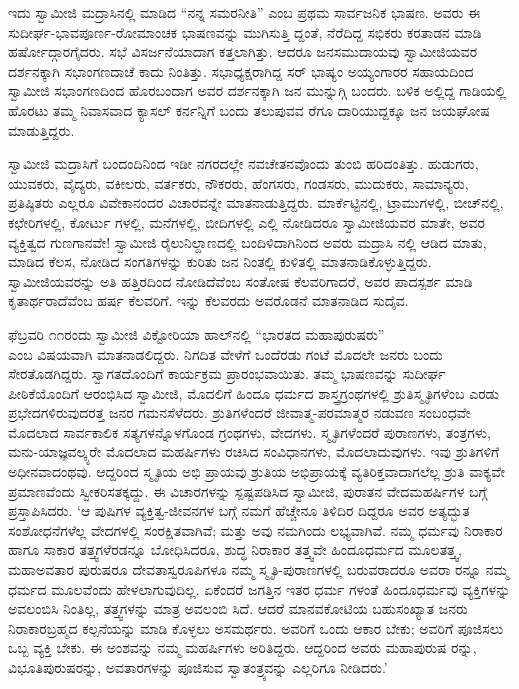 ಇದು ಸ್ವಾಮೀಜಿ ಮದ್ರಾಸಿನಲ್ಲಿ ಮಾಡಿದ “ನನ್ನ ಸಮರನೀತಿ” ಎಂಬ ಪ್ರಥಮ ಸಾರ್ವಜನಿಕ ಭಾಷಣ. ಅವರು ಈ ಸುದೀರ್ಘ-ಭಾವಪೂರ್ಣ-ರೋಮಾಂಚಕ ಭಾಷಣವನ್ನು ಮುಗಿಸುತ್ತಿ ದ್ದಂತೆ, ನೆರೆದಿದ್ದ ಸಭಿಕರು ಕರತಾಡನ ಮಾಡಿ ಹರ್ಷೋದ್ಗಾರಗೈದರು. ಸಭೆ ವಿಸರ್ಜನೆಯಾದಾಗ ಕತ್ತಲಾಗಿತ್ತು. ಆದರೂ ಜನಸಮುದಾಯವು ಸ್ವಾಮೀಜಿಯವರ ದರ್ಶನಕ್ಕಾಗಿ ಸಭಾಂಗಣದಾಚೆ ಕಾದು ನಿಂತಿತ್ತು. ಸಭಾಧ್ಯಕ್ಷರಾಗಿದ್ದ ಸರ್ ಭಾಷ್ಯಂ ಅಯ್ಯಂಗಾರರ ಸಹಾಯದಿಂದ ಸ್ವಾಮೀಜಿ ಸಭಾಂಗಣದಿಂದ ಹೊರಬಂದಾಗ ಅವರ ದರ್ಶನಕ್ಕಾಗಿ ಜನ ಮುನ್ನುಗ್ಗಿ ಬಂದರು. ಬಳಿಕ ಅಲ್ಲಿದ್ದ ಗಾಡಿಯಲ್ಲಿ ಹೊರಟು ತಮ್ಮ ನಿವಾಸವಾದ ಕ್ಯಾಸಲ್ ಕರ್ನನ್ನಿಗೆ ಬಂದು ತಲುಪುವವ ರೆಗೂ ದಾರಿಯುದ್ದಕ್ಕೂ ಜನ ಜಯಘೋಷ ಮಾಡುತ್ತಿದ್ದರು.

ಸ್ವಾಮೀಜಿ ಮದ್ರಾಸಿಗೆ ಬಂದಂದಿನಿಂದ ಇಡೀ ನಗರದಲ್ಲೇ ನವಚೇತನವೊಂದು ತುಂಬಿ ಹರಿದಂತಿತ್ತು. ಹುಡುಗರು, ಯುವಕರು, ವೈದ್ಯರು, ವಕೀಲರು, ವರ್ತಕರು, ನೌಕರರು, ಹೆಂಗಸರು, ಗಂಡಸರು, ಮುದುಕರು, ಸಾಮಾನ್ಯರು, ಪ್ರತಿಷ್ಠಿತರು ಎಲ್ಲರೂ ವಿವೇಕಾನಂದರ ವಿಚಾರವನ್ನೇ ಮಾತನಾಡುತ್ತಿದ್ದರು. ಮಾರ್ಕೆಟ್ಟಿನಲ್ಲಿ, ಟ್ರಾಮುಗಳಲ್ಲಿ, ಬೀಚ್​ನಲ್ಲಿ, ಕಛೇರಿಗಳಲ್ಲಿ, ಕೋರ್ಟು ಗಳಲ್ಲಿ, ಮನೆಗಳಲ್ಲಿ, ಬೀದಿಗಳಲ್ಲಿ ಎಲ್ಲಿ ನೋಡಿದರೂ ಸ್ವಾಮೀಜಿಯವರ ಮಾತೇ, ಅವರ ವ್ಯಕ್ತಿತ್ವದ ಗುಣಗಾನವೇ! ಸ್ವಾಮೀಜಿ ರೈಲುನಿಲ್ದಾಣದಲ್ಲಿ ಬಂದಿಳಿದಾಗಿನಿಂದ ಅವರು ಮದ್ರಾಸಿ ನಲ್ಲಿ ಆಡಿದ ಮಾತು, ಮಾಡಿದ ಕೆಲಸ, ನೋಡಿದ ಸಂಗತಿಗಳನ್ನು ಕುರಿತು ಜನ ನಿಂತಲ್ಲಿ ಕುಳಿತಲ್ಲಿ ಮಾತನಾಡಿಕೊಳ್ಳುತ್ತಿದ್ದರು. ಸ್ವಾಮೀಜಿಯವರನ್ನು ಅತಿ ಹತ್ತಿರದಿಂದ ನೋಡಿದೆವೆಂಬ ಸಂತೋಷ ಕೆಲವರಿಗಾದರೆ, ಅವರ ಪಾದಸ್ಪರ್ಶ ಮಾಡಿ ಕೃತಾರ್ಥರಾದೆವೆಂಬ ಹರ್ಷ ಕೆಲವರಿಗೆ. ಇನ್ನು ಕೆಲವರದು ಅವರೊಡನೆ ಮಾತನಾಡಿದ ಸುದೈವ.

ಫೆಬ್ರವರಿ ೧೧ರಂದು ಸ್ವಾಮೀಜಿ ವಿಕ್ಟೋರಿಯಾ ಹಾಲ್​ನಲ್ಲಿ “ಭಾರತದ ಮಹಾಪುರುಷರು”\\ಎಂಬ ವಿಷಯವಾಗಿ ಮಾತನಾಡಲಿದ್ದರು. ನಿಗದಿತ ವೇಳೆಗೆ ಒಂದೆರಡು ಗಂಟೆ ಮೊದಲೇ ಜನರು ಬಂದು ಸೇರತೊಡಗಿದ್ದರು. ಸ್ವಾಗತದೊಂದಿಗೆ ಕಾರ್ಯಕ್ರಮ ಪ್ರಾರಂಭವಾಯಿತು. ತಮ್ಮ ಭಾಷಣವನ್ನು ಸುದೀರ್ಘ ಪೀಠಿಕೆಯೊಂದಿಗೆ ಆರಂಭಿಸಿದ ಸ್ವಾಮೀಜಿ, ಮೊದಲಿಗೆ ಹಿಂದೂ ಧರ್ಮದ ಶಾಸ್ತ್ರಗ್ರಂಥಗಳಲ್ಲಿ ಶ್ರುತಿಸ್ಮೃತಿಗಳೆಂಬ ಎರಡು ಪ್ರಭೇದಗಳಿರುವುದರತ್ತ ಜನರ ಗಮನಸೆಳೆದರು. ಶ್ರುತಿಗಳೆಂದರೆ ಜೀವಾತ್ಮ-ಪರಮಾತ್ಮರ ನಡುವಣ ಸಂಬಂಧವೇ ಮೊದಲಾದ ಸಾರ್ವಕಾಲಿಕ ಸತ್ಯಗಳನ್ನೊಳಗೊಂಡ ಗ್ರಂಥಗಳು, ವೇದಗಳು. ಸ್ಮೃತಿಗಳೆಂದರೆ ಪುರಾಣಗಳು, ತಂತ್ರಗಳು, ಮನು-ಯಾಜ್ಞವಲ್ಕ್ಯರೇ ಮೊದಲಾದ ಮಹರ್ಷಿಗಳು ರಚಿಸಿದ ಸಂವಿಧಾನಗಳು, ಮೊದಲಾದುವುಗಳು. ಇವು ಶ್ರುತಿಗಳಿಗೆ ಅಧೀನವಾದಂಥವು. ಆದ್ದರಿಂದ ಸ್ಮೃತಿಯ ಅಭಿ ಪ್ರಾಯವು ಶ್ರುತಿಯ ಅಭಿಪ್ರಾಯಕ್ಕೆ ವ್ಯತಿರಿಕ್ತವಾದಾಗಲೆಲ್ಲ ಶ್ರುತಿ ವಾಕ್ಯವೇ ಪ್ರಮಾಣವೆಂದು ಸ್ವೀಕರಿಸತಕ್ಕದ್ದು. ಈ ವಿಚಾರಗಳನ್ನು ಸ್ಪಷ್ಟಪಡಿಸಿದ ಸ್ವಾಮೀಜಿ, ಪುರಾತನ ವೇದಮಹರ್ಷಿಗಳ ಬಗ್ಗೆ ಪ್ರಸ್ತಾಪಿಸಿದರು. ‘ಆ ಪುಷಿಗಳ ವ್ಯಕ್ತಿತ್ವ-ಜೀವನಗಳ ಬಗ್ಗೆ ನಮಗೆ ಹೆಚ್ಚೇನೂ ತಿಳಿದಿರ ದಿದ್ದರೂ ಅವರ ಅತ್ಯದ್ಭುತ ಸಂಶೋಧನೆಗಳೆಲ್ಲ ವೇದಗಳಲ್ಲಿ ಸಂರಕ್ಷಿತವಾಗಿವೆ; ಮತ್ತು ಅವು ನಮಗಿಂದು ಲಭ್ಯವಾಗಿವೆ. ನಮ್ಮ ಧರ್ಮವು ನಿರಾಕಾರ ಹಾಗೂ ಸಾಕಾರ ತತ್ತ್ವಗಳೆರಡನ್ನೂ ಬೋಧಿಸಿದರೂ, ಶುದ್ಧ ನಿರಾಕಾರ ತತ್ತ್ವವೇ ಹಿಂದೂಧರ್ಮದ ಮೂಲತತ್ತ್ವ, ಮಹಾಅವತಾರ ಪುರುಷರೂ ದೇವತಾಸ್ವರೂಪಿಗಳೂ ನಮ್ಮ ಸ್ಮೃತಿ-ಪುರಾಣಗಳಲ್ಲಿ ಬರುವರಾದರೂ ಅವರಾ ರನ್ನೂ ನಮ್ಮ ಧರ್ಮದ ಮೂಲವೆಂದು ಹೇಳಲಾಗುವುದಿಲ್ಲ. ಏಕೆಂದರೆ ಜಗತ್ತಿನ ಇತರ ಧರ್ಮ ಗಳಂತೆ ಹಿಂದೂಧರ್ಮವು ವ್ಯಕ್ತಿಗಳನ್ನು ಅವಲಂಬಿಸಿ ನಿಂತಿಲ್ಲ, ತತ್ತ್ವಗಳನ್ನು ಮಾತ್ರ ಅವಲಂಬಿ ಸಿದೆ. ಆದರೆ ಮಾನವಕೋಟಿಯ ಬಹುಸಂಖ್ಯಾತ ಜನರು ನಿರಾಕಾರಬ್ರಹ್ಮದ ಕಲ್ಪನೆಯನ್ನು ಮಾಡಿ ಕೊಳ್ಳಲು ಅಸಮರ್ಥರು. ಅವರಿಗೆ ಒಂದು ಆಕಾರ ಬೇಕು; ಅವರಿಗೆ ಪೂಜಿಸಲು ಒಬ್ಬ ವ್ಯಕ್ತಿ ಬೇಕು. ಈ ಅಂಶವನ್ನು ನಮ್ಮ ಮಹರ್ಷಿಗಳು ಅರಿತಿದ್ದರು. ಆದ್ದರಿಂದ ಅವರು ಮಹಾಪುರುಷ ರನ್ನು, ವಿಭೂತಿಪುರುಷರನ್ನು, ಅವತಾರಗಳನ್ನು ಪೂಜಿಸುವ ಸ್ವಾತಂತ್ರ್ಯವನ್ನು ಎಲ್ಲರಿಗೂ ನೀಡಿದರು.’

